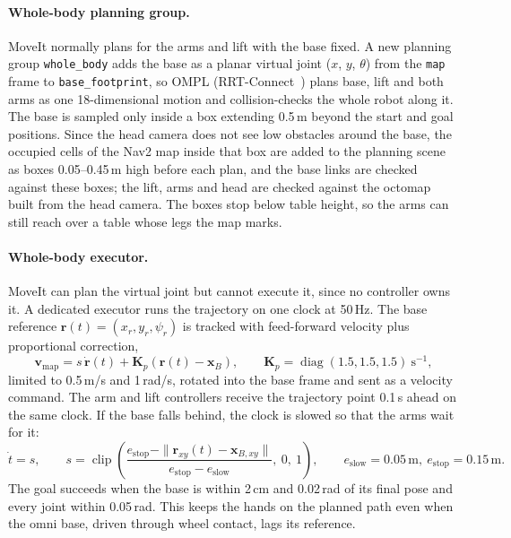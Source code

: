 \documentclass[12pt,a4paper]{article}
\begin{document}
\paragraph{Whole-body planning group.}
MoveIt normally plans for the arms and lift with the base fixed. A new planning group
\texttt{whole\_body} adds the base as a planar virtual joint ($x$, $y$, $\theta$) from the
\texttt{map} frame to \texttt{base\_footprint}, so OMPL (RRT-Connect~\cite{kuffner2000}) plans base,
lift and both arms as one 18-dimensional motion and collision-checks the whole robot along it. The
base is sampled only inside a box extending 0.5\,m beyond the start and goal positions. Since the head
camera does not see low obstacles around the base, the occupied cells of the Nav2 map inside that box
are added to the planning scene as boxes 0.05--0.45\,m high before each plan, and the base links are
checked against these boxes; the lift, arms and head are checked against the octomap built from the
head camera. The boxes stop below table height, so the arms can still reach over a table whose legs the
map marks.

\paragraph{Whole-body executor.}
MoveIt can plan the virtual joint but cannot execute it, since no controller owns it. A dedicated
executor runs the trajectory on one clock at 50\,Hz. The base reference
$\mathbf{r}(t)=(x_r,y_r,\psi_r)$ is tracked with feed-forward velocity plus proportional correction,
\begin{equation}
    \mathbf{v}_{\mathrm{map}} = s\,\dot{\mathbf{r}}(t) + \mathbf{K}_p\left(\mathbf{r}(t)-\mathbf{x}_B\right),
    \qquad
    \mathbf{K}_p=\operatorname{diag}(1.5,1.5,1.5)\ \mathrm{s}^{-1},
\end{equation}
limited to 0.5\,m/s and 1\,rad/s, rotated into the base frame and sent as a velocity command. The
arm and lift controllers receive the trajectory point 0.1\,s ahead on the same clock. If the base falls
behind, the clock is slowed so that the arms wait for it:
\begin{equation}
    \dot t = s,\qquad
    s=\operatorname{clip}\!\left(\frac{e_{\mathrm{stop}}-\|\mathbf{r}_{xy}(t)-\mathbf{x}_{B,xy}\|}{e_{\mathrm{stop}}-e_{\mathrm{slow}}},\ 0,\ 1\right),
    \qquad e_{\mathrm{slow}}=0.05\,\mathrm{m},\ e_{\mathrm{stop}}=0.15\,\mathrm{m}.
\end{equation}
The goal succeeds when the base is within 2\,cm and 0.02\,rad of its final pose and every joint within
0.05\,rad. This keeps the hands on the planned path even when the omni base, driven through wheel
contact, lags its reference.
\end{document}
